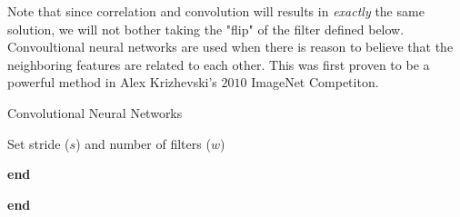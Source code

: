 \documentclass{article}
\begin{document}
Note that since correlation and convolution will results in \emph{exactly} the same solution, we will not bother taking the "flip" of the filter defined below. Convoultional neural networks are used when there is reason to believe that the neighboring features are related to each other. This was first proven to be a powerful method in Alex Krizhevski's $2010$ ImageNet Competiton.
\begin{algorithm}
  \caption{Convolutional Neural Networks
    \label{alg:nn}}
  \begin{algorithmic}[1]
    \Statex
    \State Set stride ($s$) and number of filters ($w$)
          
       \EndProcedure
       \State \textbf{end}
          
       \EndProcedure
       \State \textbf{end}

       \EndProcedure
    \EndWhile
  \end{algorithmic}
\end{algorithm}
\end{document}
